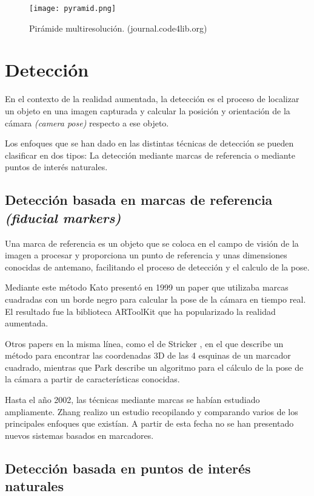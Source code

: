 \begin{figure}
  \centering
  \texttt{[image: pyramid.png]}
  \caption{Pirámide multiresolución. (journal.code4lib.org)}
  \label{fig:pirescale}
\end{figure}

\section{Detección}
En el contexto de la realidad aumentada, la detección es el proceso de localizar un objeto en una imagen capturada y calcular la posición y orientación de la cámara \emph{(camera pose)} respecto a ese objeto.

Los enfoques que se han dado en las distintas técnicas de detección se pueden clasificar en dos tipos: La detección mediante marcas de referencia o mediante puntos de interés naturales.

\subsection{Detección basada en marcas de referencia \emph{(fiducial markers)}}
Una marca de referencia es un objeto que se coloca en el campo de visión de la imagen a procesar y proporciona un punto de referencia y unas dimensiones conocidas de antemano, facilitando el proceso de detección y el calculo de la pose.

Mediante este método Kato presentó en 1999 un paper que utilizaba marcas cuadradas con un borde negro para calcular la pose de la cámara en tiempo real\cite{Kato}. El resultado fue la biblioteca ARToolKit que ha popularizado la realidad aumentada.

Otros papers en la misma línea, como el de Stricker \cite{Stricker}, en el que describe un método para encontrar las coordenadas 3D de las 4 esquinas de un marcador cuadrado, mientras que Park \cite{Park2} describe un algoritmo para el cálculo de la pose de la cámara a partir de características conocidas.

Hasta el año 2002, las técnicas mediante marcas se habían estudiado ampliamente. Zhang \cite{Zhang} realizo un estudio recopilando y comparando varios de los principales enfoques que existían. A partir de esta fecha no se han presentado nuevos sistemas basados en marcadores.

\subsection{Detección basada en puntos de interés naturales}

